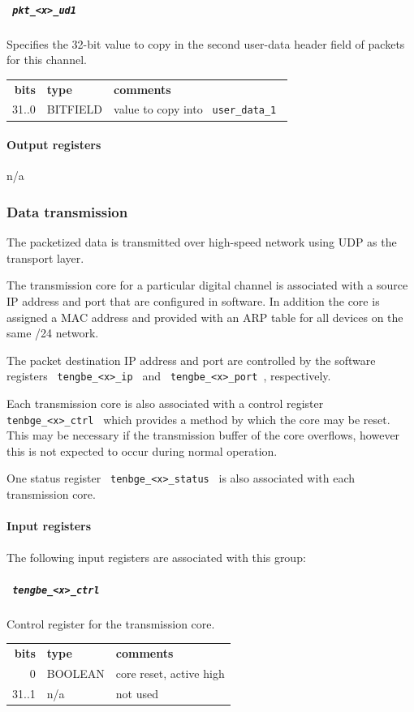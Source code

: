 \documentclass[a4paper,10pt]{article}
\newcommand{\ilcode}[1]{\begingroup
	\setlength{\fboxsep}{1pt}\colorbox{ilcodebg}{\small\tt%
		#1%
	}\endgroup}
\begin{document}
\subparagraph{\ilcode{pkt\_<x>\_ud1}}
Specifies the 32-bit value to copy in the second user-data header field
of packets for this channel.\\
\begin{tabular}{rll}
	{\bf bits} & {\bf type} & {\bf comments}\\
	  31..0 & BITFIELD & value to copy into \ilcode{user\_data\_1}
\end{tabular}

\paragraph{Output registers}
n/a

\subsubsection{Data transmission}
\label{sec:gwdcpdtx}
The packetized data is transmitted over high-speed network using UDP as 
the transport layer.

The transmission core for a particular digital channel is associated 
with a source IP address and port that are configured in software. In 
addition the core is assigned a MAC address and provided with an ARP 
table for all devices on the same /24 network.

The packet destination IP address and port are controlled by the 
software registers \ilcode{tengbe\_<x>\_ip} and 
\ilcode{tengbe\_<x>\_port}, respectively.

Each transmission core is also associated with a control register 
\ilcode{tenbge\_<x>\_ctrl} which provides a method by which the core 
may be reset. This may be necessary if the transmission buffer of the 
core overflows, however this is not expected to occur during normal 
operation.

One status register \ilcode{tenbge\_<x>\_status} is also associated with 
each transmission core.

\paragraph{Input registers}
The following input registers are associated with this group:

\subparagraph{\ilcode{tengbe\_<x>\_ctrl}}
Control register for the transmission core.\\
\begin{tabular}{rll}
	{\bf bits} & {\bf type} & {\bf comments}\\
	    0 & BOOLEAN & core reset, active high\\
	31..1 & n/a     & not used
\end{tabular}
\end{document}
